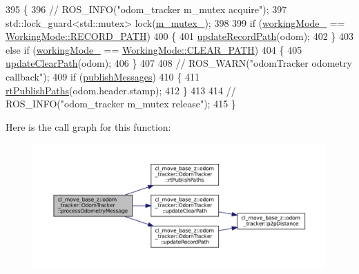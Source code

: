 \begin{DoxyCode}
395 \{
396   \textcolor{comment}{// ROS\_INFO("odom\_tracker m\_mutex acquire");}
397   std::lock\_guard<std::mutex> lock(\hyperlink{classcl__move__base__z_1_1odom__tracker_1_1OdomTracker_aa371639e1eee269273dec8d3ab9dba0f}{m\_mutex\_});
398 
399   \textcolor{keywordflow}{if} (\hyperlink{classcl__move__base__z_1_1odom__tracker_1_1OdomTracker_a5ae598c85c4469f4c0e984480575c42b}{workingMode\_} == \hyperlink{namespacecl__move__base__z_1_1odom__tracker_ac46b05813b2791604f6cd0a39ace3ef8a023bc3adf68871ef7a0c616765ac80a7}{WorkingMode::RECORD\_PATH})
400   \{
401     \hyperlink{classcl__move__base__z_1_1odom__tracker_1_1OdomTracker_a77a66083573c6bef726d77447fb53349}{updateRecordPath}(odom);
402   \}
403   \textcolor{keywordflow}{else} \textcolor{keywordflow}{if} (\hyperlink{classcl__move__base__z_1_1odom__tracker_1_1OdomTracker_a5ae598c85c4469f4c0e984480575c42b}{workingMode\_} == \hyperlink{namespacecl__move__base__z_1_1odom__tracker_ac46b05813b2791604f6cd0a39ace3ef8a68783989ae56d7f2f9496c66c417a192}{WorkingMode::CLEAR\_PATH})
404   \{
405     \hyperlink{classcl__move__base__z_1_1odom__tracker_1_1OdomTracker_abe7ba4dbf014e1f2c64b5806ce42c073}{updateClearPath}(odom);
406   \}
407 
408   \textcolor{comment}{// ROS\_WARN("odomTracker odometry callback");}
409   \textcolor{keywordflow}{if} (\hyperlink{classcl__move__base__z_1_1odom__tracker_1_1OdomTracker_a4f253d45ab5750dee3c2f18dd5599725}{publishMessages})
410   \{
411     \hyperlink{classcl__move__base__z_1_1odom__tracker_1_1OdomTracker_a8f728f85d1f3f49f4b94e37052a59d6d}{rtPublishPaths}(odom.header.stamp);
412   \}
413 
414   \textcolor{comment}{// ROS\_INFO("odom\_tracker m\_mutex release");}
415 \}
\end{DoxyCode}
Here is the call graph for this function\+:
\nopagebreak
\begin{figure}[H]
\begin{center}
\leavevmode
\includegraphics[width=350pt]{classcl__move__base__z_1_1odom__tracker_1_1OdomTracker_a12c5a839cfde2e8f2f55a5e0c9647b18_cgraph}
\end{center}
\end{figure}

